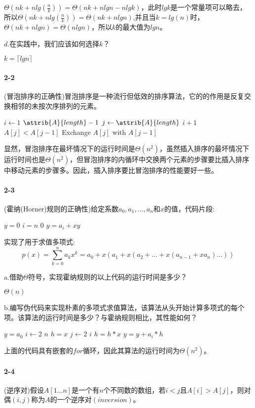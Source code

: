 \documentclass[a4paper,11pt]{article}
\newcommand{\ceiling}[1]{\lceil #1 \rceil}
\begin{document}
$\Theta(nk+nlg(\frac{n}{k}))=\Theta(nk+nlgn-nlgk)$，此时$lgk$是一个常量项可以略去，所以$\Theta(nk+nlg(\frac{n}{k}))=\Theta(nk+nlgn)$,并且当$k=lg(n)$时，$\Theta(nk+nlgn)=\Theta(nlgn)$，所以$k$的最大值为$lgn$。

$d.$在实践中，我们应该如何选择$k$？

$k=\ceiling{lgn}$

\paragraph*{2-2}(冒泡排序的正确性)冒泡排序是一种流行但低效的排序算法，它的的作用是反复交换相邻的未按次序排列的元素。
\begin{codebox}
	\li \For $i \gets 1$ \To $\attrib{A}{length}-1$ 
	\li		\Do
			\For $j \gets \attrib{A}{length}$ \Downto $i+1$
	\li			\Do
					\If $A[j] < A[j-1]$
	\li				\Then
						Exchange $A[j]$ with $A[j-1]$
					\End
				\End
			\End
\end{codebox}
\noindent 显然，冒泡排序在最坏情况下的运行时间是$\Theta(n^2)$，虽然插入排序的最坏情况下运行时间也是$\Theta(n^2)$，但冒泡排序的内循环中交换两个元素的步骤要比插入排序中移动元素的步骤多。因此，插入排序要比冒泡排序的性能要好一些。

\paragraph*{2-3}(霍纳(Horner)规则的正确性)给定系数$a_0,a_1,\dots,a_n$和$x$的值，代码片段:
\begin{codebox}
	\li $y=0$
	\li \For $i=n$ \Downto $0$
	\li		\Do
				$y=a_i+xy$
			\End
\end{codebox}
实现了用于求值多项式:
\[
p(x)=\sum_{k=0}^{n}a_kx^k=a_0+x(a_1+x(a_2+\dots+x(a_{n-1}+xa_n)\dots))
\]

a.借助$\Theta$符号，实现霍纳规则的以上代码的运行时间是多少？

$\Theta(n)$

b.编写伪代码来实现朴素的多项式求值算法，该算法从头开始计算多项式的每个项。该算法的运行时间是多少？与霍纳规则相比，其性能如何？
\begin{codebox}
	\li $y = a_0$
	\li \For $i \gets 2$ \To $n$
	\li		\Do
				$h=x$
	\li         \For $j\gets2$ \To $i$
	\li				\Do
						$h=h*x$
					\End
	\li		$y=y+a_i*h$
			\End
\end{codebox}
\noindent 上面的代码具有嵌套的$for$循环，因此其算法的运行时间为$\Theta(n^2)$。

\paragraph*{2-4}(逆序对)假设$A[1 \dots n]$是一个有$n$个不同数的数组，若$i<j$且$A[i]>A[j]$，则对偶$(i,j)$称为$A$的一个逆序对$(inversion)$。
\end{document}
